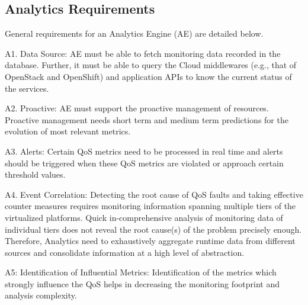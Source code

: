 \subsection{Analytics Requirements}
General requirements for an Analytics Engine (AE) are detailed below. 

A1. Data Source: AE must be able to fetch monitoring data recorded in the database. Further, it must be able to query the Cloud middlewares (e.g., that of OpenStack and OpenShift) and application APIs to know the current status of the services. 

A2. Proactive: AE must support the proactive management of resources. Proactive management needs short term and medium term predictions for the evolution of most relevant metrics. 

A3. Alerts: Certain QoS metrics need to be processed in real time and alerts should be triggered when these QoS metrics are violated or approach certain threshold values. 

A4. Event Correlation: Detecting the root cause of QoS faults and taking effective counter measures requires monitoring information spanning multiple tiers of the virtualized platforms. Quick in-comprehensive analysis of monitoring data of individual tiers does not reveal the root cause(s) of the problem precisely enough. Therefore, Analytics need to exhaustively aggregate runtime data from different sources and consolidate information at a high level of abstraction. 

A5: Identification of Influential Metrics: Identification of the metrics which strongly influence the QoS helps in decreasing the monitoring footprint and analysis complexity.

